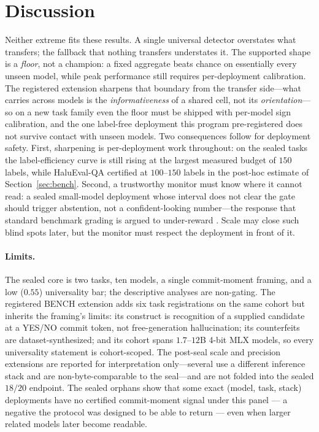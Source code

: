 \documentclass[11pt]{article}
\begin{document}
\FloatBarrier
\section{Discussion}

Neither extreme fits these results. A single universal detector overstates what transfers; the
fallback that nothing transfers understates it. The supported shape is a \emph{floor}, not a
champion: a fixed aggregate beats chance on essentially every unseen model, while peak performance
still requires per-deployment calibration. The registered extension sharpens that boundary from the
transfer side---what carries across models is the \emph{informativeness} of a shared cell, not its
\emph{orientation}---so on a new task family even the floor must be shipped with per-model sign
calibration, and the one label-free deployment this program pre-registered does not survive contact
with unseen models. Two consequences follow for deployment safety. First, sharpening is
per-deployment work throughout: on the sealed tasks the label-efficiency curve is still rising at the
largest measured budget of $150$ labels, while HaluEval-QA certified at $100$--$150$ labels in the
post-hoc estimate of Section~\ref{sec:bench}. Second, a trustworthy monitor must know where it cannot
read: a sealed small-model deployment whose interval does not clear the gate should trigger
abstention, not a confident-looking number---the response that standard benchmark grading is argued
to under-reward \cite{kalai2025hallucinate}. Scale may close such blind spots later, but the monitor
must respect the deployment in front of it.

\paragraph{Limits.} The sealed core is two tasks, ten models, a single commit-moment framing, and
a low ($0.55$) universality bar; the descriptive analyses are non-gating. The registered BENCH
extension adds six task registrations on the same cohort but inherits the framing's limits: its
construct is recognition of a supplied candidate at a YES/NO commit token, not free-generation
hallucination; its counterfeits are dataset-synthesized; and its cohort spans $1.7$--$12$B 4-bit
MLX models, so every universality statement is cohort-scoped. The post-seal scale and precision
extensions are reported for interpretation only---several use a different inference stack and are
non-byte-comparable to the seal---and are not folded into the sealed $18/20$ endpoint. The sealed
orphans show that some exact (model, task, stack) deployments have no certified
commit-moment signal under this panel --- a negative the protocol was designed to be able to
return --- even when larger related models later become readable.
\end{document}
